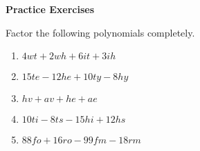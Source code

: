 \textbf{Practice Exercises}

\vspce

Factor the following polynomials completely. 

\begin{enumerate}
\item \hspce $4wt + 2wh + 6it + 3ih$
\item \hspce $15te - 12he + 10ty -8hy$
\item \hspce $hv + av + he + ae$
\item \hspce $10ti - 8ts - 15hi + 12hs$
\item \hspce $88fo + 16ro - 99fm - 18rm$
\end{enumerate}